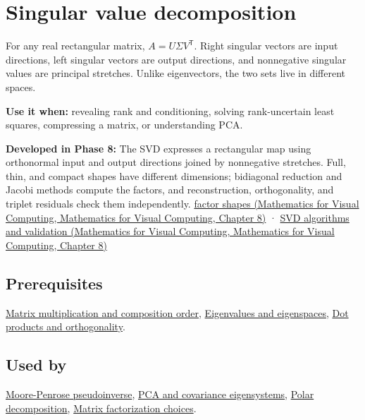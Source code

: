 \hypertarget{appendix-1fad5e7f36fa}{}\label{referencestart:appendix-1fad5e7f36fa}
\section{Singular value decomposition}\label{appendix-1fad5e7f36fa-singular-value-decomposition}

For any real rectangular matrix, \(A=U\Sigma V^\mathsf T\). Right singular vectors are input directions, left singular vectors are output directions, and nonnegative singular values are principal stretches. Unlike eigenvectors, the two sets live in different spaces.

\textbf{Use it when:} revealing rank and conditioning, solving rank-uncertain least squares, compressing a matrix, or understanding PCA.

\textbf{Developed in Phase 8:} The SVD expresses a rectangular map using orthonormal input and output directions joined by nonnegative stretches. Full, thin, and compact shapes have different dimensions; bidiagonal reduction and Jacobi methods compute the factors, and reconstruction, orthogonality, and triplet residuals check them independently. \href{../02-Mathematics-for-Visual-Computing/main.pdf\#nameddest=02-foundations-ii-ch024-full-thin-and-compact-shapes-for-tall-and-wide-matrices}{factor shapes (Mathematics for Visual Computing, Mathematics for Visual Computing, Chapter 8)} · \href{../02-Mathematics-for-Visual-Computing/main.pdf\#nameddest=02-foundations-ii-ch024-how-numerical-software-computes-and-checks-an-svd}{SVD algorithms and validation (Mathematics for Visual Computing, Mathematics for Visual Computing, Chapter 8)}

\subsection{Prerequisites}\label{appendix-1fad5e7f36fa-prerequisites}

\hyperref[appendix-ab31ef447dbf]{Matrix multiplication and composition order}, \hyperref[appendix-0b3be18411f9]{Eigenvalues and eigenspaces}, \hyperref[appendix-8bc4e8fc547c]{Dot products and orthogonality}.

\subsection{Used by}\label{appendix-1fad5e7f36fa-used-by}

\hyperref[appendix-541306fdbc1b]{Moore-Penrose pseudoinverse}, \hyperref[appendix-ad175ef3c5bf]{PCA and covariance eigensystems}, \hyperref[appendix-73f5bcf7a462]{Polar decomposition}, \hyperref[appendix-221a483bec2d]{Matrix factorization choices}.

